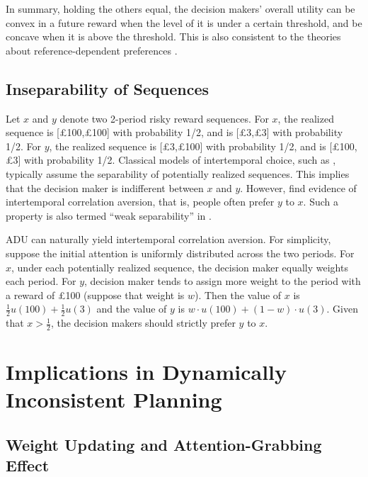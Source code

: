 \documentclass[
  12pt,
]{article}
\begin{document}
In summary, holding the others equal, the decision makers' overall
utility can be convex in a future reward when the level of it is under a
certain threshold, and be concave when it is above the threshold. This
is also consistent to the theories about reference-dependent preferences
\citep{koszegi_model_2006}.

\hypertarget{inseparability-of-sequences}{%
\subsection{Inseparability of
Sequences}\label{inseparability-of-sequences}}

Let \(x\) and \(y\) denote two 2-period risky reward sequences. For
\(x\), the realized sequence is {[}£100,£100{]} with probability 1/2,
and is {[}£3,£3{]} with probability 1/2. For \(y\), the realized
sequence is {[}£3,£100{]} with probability 1/2, and is {[}£100,£3{]}
with probability 1/2. Classical models of intertemporal choice, such as
\citet{fishburn_time_1982}, typically assume the separability of
potentially realized sequences. This implies that the decision maker is
indifferent between \(x\) and \(y\). However,
\citet{andersen_multiattribute_2018} find evidence of intertemporal
correlation aversion, that is, people often prefer \(y\) to \(x\). Such
a property is also termed ``weak separability'' in
\citet{noor_constrained_2023}.

ADU can naturally yield intertemporal correlation aversion. For
simplicity, suppose the initial attention is uniformly distributed
across the two periods. For \(x\), under each potentially realized
sequence, the decision maker equally weights each period. For \(y\),
decision maker tends to assign more weight to the period with a reward
of £100 (suppose that weight is \(w\)). Then the value of \(x\) is
\(\frac{1}{2} u(100) + \frac{1}{2} u(3)\) and the value of \(y\) is
\(w\cdot u(100) +(1-w) \cdot u(3)\). Given that \(x>\frac{1}{2}\), the
decision makers should strictly prefer \(y\) to \(x\).

\hypertarget{implications-in-dynamically-inconsistent-planning}{%
\section{Implications in Dynamically Inconsistent
Planning}\label{implications-in-dynamically-inconsistent-planning}}

\hypertarget{weight-updating-and-attention-grabbing-effect}{%
\subsection{Weight Updating and Attention-Grabbing
Effect}\label{weight-updating-and-attention-grabbing-effect}}
\end{document}

